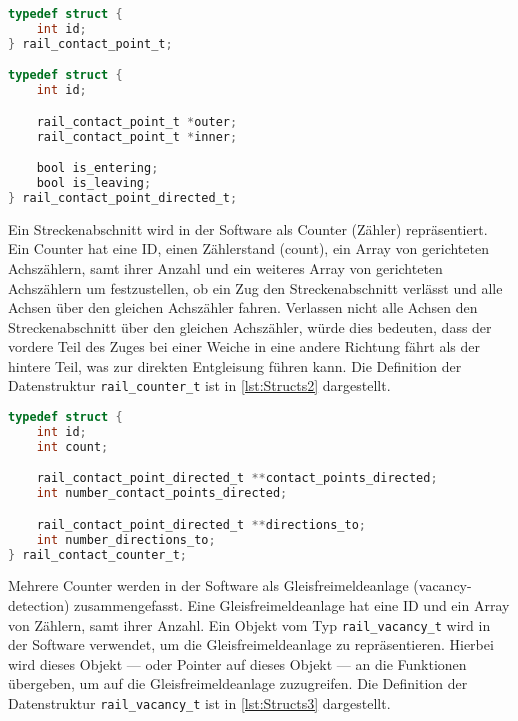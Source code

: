 \begin{margin}
    \begin{lstlisting}[language=C, caption={Definition der Datenstrukturen}, label={code:Entwicklung-der-GFA:Implementierung-der-Gleisfreimeldeanlage:Achszaehler:Definitionen-der-Structs}]
typedef struct {
    int id;
} rail_contact_point_t;

typedef struct {
    int id;

    rail_contact_point_t *outer;
    rail_contact_point_t *inner;

    bool is_entering;
    bool is_leaving;
} rail_contact_point_directed_t;
    \end{lstlisting}
\end{margin}

Ein Streckenabschnitt wird in der Software als Counter (Zähler) repräsentiert. Ein Counter hat eine ID, einen Zählerstand (count), ein Array von gerichteten Achszählern, samt ihrer Anzahl und ein weiteres Array von gerichteten Achszählern um festzustellen, ob ein Zug den Streckenabschnitt verlässt und alle Achsen über den gleichen Achszähler fahren. Verlassen nicht alle Achsen den Streckenabschnitt über den gleichen Achszähler, würde dies bedeuten, dass der vordere Teil des Zuges bei einer Weiche in eine andere Richtung fährt als der hintere Teil, was zur direkten Entgleisung führen kann. Die Definition der Datenstruktur \texttt{rail\_counter\_t} ist in \autoref{lst:Structs2} dargestellt.

\begin{margin}
    \begin{lstlisting}[caption={Definition der Datenstruktur rail\_counter\_t},label={lst:Structs2},language=C]
typedef struct {
    int id;
    int count;

    rail_contact_point_directed_t **contact_points_directed;
    int number_contact_points_directed;

    rail_contact_point_directed_t **directions_to;
    int number_directions_to;
} rail_contact_counter_t;
    \end{lstlisting}
\end{margin}

Mehrere Counter werden in der Software als Gleisfreimeldeanlage (vacancy-detection) zusammengefasst. Eine Gleisfreimeldeanlage hat eine ID und ein Array von Zählern, samt ihrer Anzahl. Ein Objekt vom Typ \texttt{rail\_vacancy\_t} wird in der Software verwendet, um die Gleisfreimeldeanlage zu repräsentieren. Hierbei wird dieses Objekt --- oder Pointer auf dieses Objekt --- an die Funktionen übergeben, um auf die Gleisfreimeldeanlage zuzugreifen. Die Definition der Datenstruktur \texttt{rail\_vacancy\_t} ist in \autoref{lst:Structs3} dargestellt.

